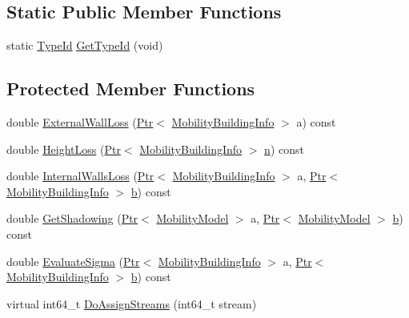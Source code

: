 \subsection*{Static Public Member Functions}
\begin{DoxyCompactItemize}
\item 
static \hyperlink{classns3_1_1TypeId}{Type\+Id} \hyperlink{classns3_1_1BuildingsPropagationLossModel_a1a4accdc8f9f8edd9ba4768827d199dd}{Get\+Type\+Id} (void)
\end{DoxyCompactItemize}
\subsection*{Protected Member Functions}
\begin{DoxyCompactItemize}
\item 
double \hyperlink{classns3_1_1BuildingsPropagationLossModel_a67bc86adffb07914535f5f6f435fac47}{External\+Wall\+Loss} (\hyperlink{classns3_1_1Ptr}{Ptr}$<$ \hyperlink{classns3_1_1MobilityBuildingInfo}{Mobility\+Building\+Info} $>$ a) const 
\item 
double \hyperlink{classns3_1_1BuildingsPropagationLossModel_a52e994b78d200ecb8d30d1b61dedbfff}{Height\+Loss} (\hyperlink{classns3_1_1Ptr}{Ptr}$<$ \hyperlink{classns3_1_1MobilityBuildingInfo}{Mobility\+Building\+Info} $>$ \hyperlink{lte__link__budget__x2__handover__measures_8m_abdb05bc5a064cf642a06c83b3392f148}{n}) const 
\item 
double \hyperlink{classns3_1_1BuildingsPropagationLossModel_a5d8bdc1afcb1061352e0e24a0b3db396}{Internal\+Walls\+Loss} (\hyperlink{classns3_1_1Ptr}{Ptr}$<$ \hyperlink{classns3_1_1MobilityBuildingInfo}{Mobility\+Building\+Info} $>$ a, \hyperlink{classns3_1_1Ptr}{Ptr}$<$ \hyperlink{classns3_1_1MobilityBuildingInfo}{Mobility\+Building\+Info} $>$ \hyperlink{lte__pathloss_8m_a21ad0bd836b90d08f4cf640b4c298e7c}{b}) const 
\item 
double \hyperlink{classns3_1_1BuildingsPropagationLossModel_a86284db6dc9c9ce92d707e6de5319e56}{Get\+Shadowing} (\hyperlink{classns3_1_1Ptr}{Ptr}$<$ \hyperlink{classns3_1_1MobilityModel}{Mobility\+Model} $>$ a, \hyperlink{classns3_1_1Ptr}{Ptr}$<$ \hyperlink{classns3_1_1MobilityModel}{Mobility\+Model} $>$ \hyperlink{lte__pathloss_8m_a21ad0bd836b90d08f4cf640b4c298e7c}{b}) const 
\item 
double \hyperlink{classns3_1_1BuildingsPropagationLossModel_ab1007b81884b18564b1d1542fa6ee6b8}{Evaluate\+Sigma} (\hyperlink{classns3_1_1Ptr}{Ptr}$<$ \hyperlink{classns3_1_1MobilityBuildingInfo}{Mobility\+Building\+Info} $>$ a, \hyperlink{classns3_1_1Ptr}{Ptr}$<$ \hyperlink{classns3_1_1MobilityBuildingInfo}{Mobility\+Building\+Info} $>$ \hyperlink{lte__pathloss_8m_a21ad0bd836b90d08f4cf640b4c298e7c}{b}) const 
\item 
virtual int64\+\_\+t \hyperlink{classns3_1_1BuildingsPropagationLossModel_ab76339ec37256682c65b0c991c8e34e3}{Do\+Assign\+Streams} (int64\+\_\+t stream)
\end{DoxyCompactItemize}
